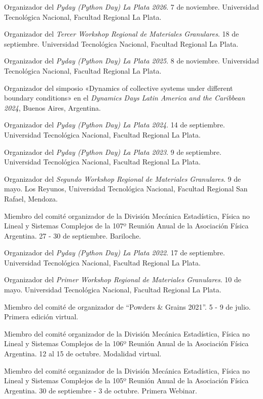 \begin{timeline}
   Organizador del \textit{Pyday (Python Day) La Plata 2026}. 7 de noviembre. Universidad Tecnológica Nacional, Facultad Regional La Plata.

   Organizador del \textit{Tercer Workshop Regional de Materiales Granulares}. 18 de septiembre. Universidad Tecnológica Nacional, Facultad Regional La Plata.

   Organizador del \textit{Pyday (Python Day) La Plata 2025}. 8 de noviembre. Universidad Tecnológica Nacional, Facultad Regional La Plata.

   Organizador del simposio «Dynamics of collective systems under different boundary conditions» en el \textit{Dynamics Days Latin America and the Caribbean 2024}, Buenos Aires, Argentina.

   Organizador del \textit{Pyday (Python Day) La Plata 2024}. 14 de septiembre. Universidad Tecnológica Nacional, Facultad Regional La Plata.

   Organizador del \textit{Pyday (Python Day) La Plata 2023}. 9 de septiembre. Universidad Tecnológica Nacional, Facultad Regional La Plata.

   Organizador del \textit{Segundo Workshop Regional de Materiales Granulares}. 9 de mayo. Los Reyunos, Universidad Tecnológica Nacional, Facultad Regional San Rafael, Mendoza.

   Miembro del comité organizador de la División Mecánica Estadística, Física no Lineal y Sistemas Complejos de la 107º Reunión Anual de la Asociación Física Argentina. 27 - 30 de septiembre. Bariloche.

   Organizador del \textit{Pyday (Python Day) La Plata 2022}. 17 de septiembre. Universidad Tecnológica Nacional, Facultad Regional La Plata.

   Organizador del \textit{Primer Workshop Regional de Materiales Granulares}. 10 de mayo. Universidad Tecnológica Nacional, Facultad Regional La Plata.

   Miembro del comité de organizador de ``Powders \& Grains 2021''. 5 - 9 de julio. Primera edición virtual.

   Miembro del comité organizador de la División Mecánica Estadística, Física no Lineal y Sistemas Complejos de la 106º Reunión Anual de la Asociación Física Argentina. 12 al 15 de octubre. Modalidad virtual.

   Miembro del comité organizador de la División Mecánica Estadística, Física no Lineal y Sistemas Complejos de la 105º Reunión Anual de la Asociación Física Argentina. 30 de septiembre - 3 de octubre. Primera Webinar.


\end{timeline}
